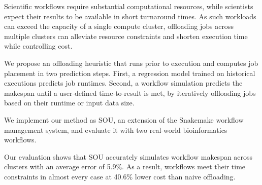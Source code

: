Scientific workflows require substantial computational resources, while scientists expect their results to be available in short turnaround times. 
As such workloads can exceed the capacity of a single compute cluster, offloading jobs across multiple clusters can alleviate resource constraints and shorten execution time while controlling cost. 

We propose an offloading heuristic that runs prior to execution and computes job placement in two prediction steps. First, a regression model trained on historical executions predicts job runtimes. Second, a workflow simulation predicts the makespan until a user-defined time-to-result is met, by iteratively offloading jobs based on their runtime or input data size.

We implement our method as SOU, an extension of the Snakemake workflow management system, and evaluate it with two real-world bioinformatics workflows.

Our evaluation shows that SOU accurately simulates workflow makespan across clusters with an average error of 5.9\%. As a result, workflows meet their time constraints in almost every case at 40.6\% lower cost than naive offloading.


